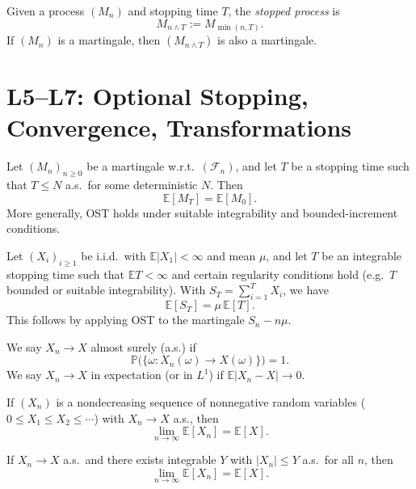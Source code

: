 \documentclass[answers,12pt,addpoints]{exam}
\begin{document}
\begin{definition}
Given a process $(M_n)$ and stopping time $T$, the \emph{stopped process} is
\[
M_{n\wedge T} := M_{\min(n,T)}.
\]
If $(M_n)$ is a martingale, then $(M_{n\wedge T})$ is also a martingale.
\end{definition}

\section{L5–L7: Optional Stopping, Convergence, Transformations}

\begin{theorem}
Let $(M_n)_{n\ge 0}$ be a martingale w.r.t.\ $(\mathcal{F}_n)$, and let $T$ be a stopping time such that $T\le N$ a.s.\ for some deterministic $N$. Then
\[
\mathbb{E}[M_T] = \mathbb{E}[M_0].
\]
More generally, OST holds under suitable integrability and bounded-increment conditions.
\end{theorem}

\begin{theorem}
Let $(X_i)_{i\ge 1}$ be i.i.d.\ with $\mathbb{E}|X_1|<\infty$ and mean $\mu$, and let $T$ be an integrable stopping time such that $\mathbb{E}T<\infty$ and certain regularity conditions hold (e.g.\ $T$ bounded or suitable integrability). With $S_T = \sum_{i=1}^T X_i$, we have
\[
\mathbb{E}[S_T] = \mu\, \mathbb{E}[T].
\]
This follows by applying OST to the martingale $S_n - n\mu$.
\end{theorem}

\begin{definition}
We say $X_n\to X$ almost surely (a.s.) if
\[
\mathbb{P}\big(\{\omega: X_n(\omega)\to X(\omega)\}\big)=1.
\]
We say $X_n\to X$ in expectation (or in $L^1$) if $\mathbb{E}|X_n-X|\to 0$.
\end{definition}

\begin{theorem}
If $(X_n)$ is a nondecreasing sequence of nonnegative random variables ($0\le X_1\le X_2\le\cdots$) with $X_n\to X$ a.s., then
\[
\lim_{n\to\infty}\mathbb{E}[X_n]=\mathbb{E}[X].
\]
\end{theorem}

\begin{theorem}
If $X_n\to X$ a.s.\ and there exists integrable $Y$ with $|X_n|\le Y$ a.s.\ for all $n$, then
\[
\lim_{n\to\infty}\mathbb{E}[X_n]=\mathbb{E}[X].
\]
\end{theorem}
\end{document}
